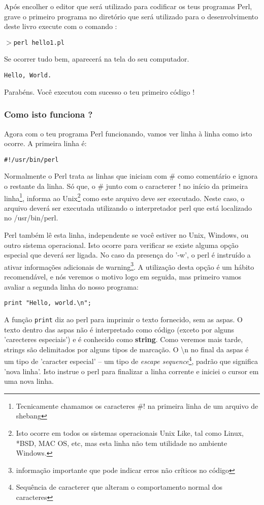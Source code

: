 \documentclass[a4paper,12pt,twoside]{book}
\begin{document}
\noindent Após encolher o editor que será utilizado para codificar os teus programas Perl, 
grave o primeiro programa no diretório que será utilizado para o desenvolvimento deste 
livro execute com o comando :\medskip

\noindent $>$\texttt{perl hello1.pl}\medskip

\noindent Se ocorrer tudo bem, aparecerá na tela do seu computador.\medskip

\noindent \texttt{Hello, World.}\medskip

\noindent Parabéns. Você executou com sucesso o teu primeiro código !

\subsubsection{Como isto funciona ?}
\noindent Agora com o teu programa Perl funcionando, vamos ver linha à 
linha como isto ocorre. A primeira linha é:\medskip

\noindent \texttt{\#!/usr/bin/perl}

\noindent Normalmente o Perl trata as linhas que iniciam com \# como
comentário e ignora o restante da linha. S\'o que, o \# junto com o caracterer ! 
no início da primeira linha\footnote{Tecnicamente chamamos os caracteres \#! na primeira linha de um arquivo de shebang}, informa ao Unix\footnote{Isto ocorre em todos os 
sistemas operacionais Unix Like, tal como Linux, *BSD, MAC OS, etc, mas esta 
linha não tem utilidade no ambiente Windows.} como este arquivo deve ser 
executado. Neste caso, o arquivo deverá ser executada utilizando o interpretador 
perl que está localizado no /usr/bin/perl.\medskip

\noindent Perl também lê esta linha, independente se você estiver no Unix, 
Windows, ou outro sistema operacional. Isto ocorre para verificar se existe 
alguma opção especial que deverá ser ligada. No caso da presença do '-w', 
o perl é instruído a ativar informações adicionais de warning\footnote{informação 
importante que pode indicar erros não críticos no código}. A utilização desta 
opção é um hábito recomendável, e nós veremos o motivo logo em seguida, mas 
primeiro vamos avaliar a segunda linha do nosso programa:\medskip

\noindent \texttt{print "Hello, world.\textbackslash n";}\medskip

\noindent A função \texttt{print} diz ao perl para imprimir o texto fornecido, sem as
aspas. O texto dentro das aspas não é interpretado como código (exceto por
alguns 'carecteres especiais') e é conhecido como \textbf{string}.
Como veremos mais tarde, strings são delimitados por alguns tipos de marcação.
O \textbackslash n no final da aspas é um tipo de 'caracter especial' -- um 
tipo de \textit{escape sequence}\footnote{Sequência de caracterer que alteram 
o comportamento normal dos caracteres}, padrão que significa 'nova linha'. Isto 
instrue o perl para finalizar a linha corrente e iniciei o cursor em uma nova linha.\medskip
\end{document}
